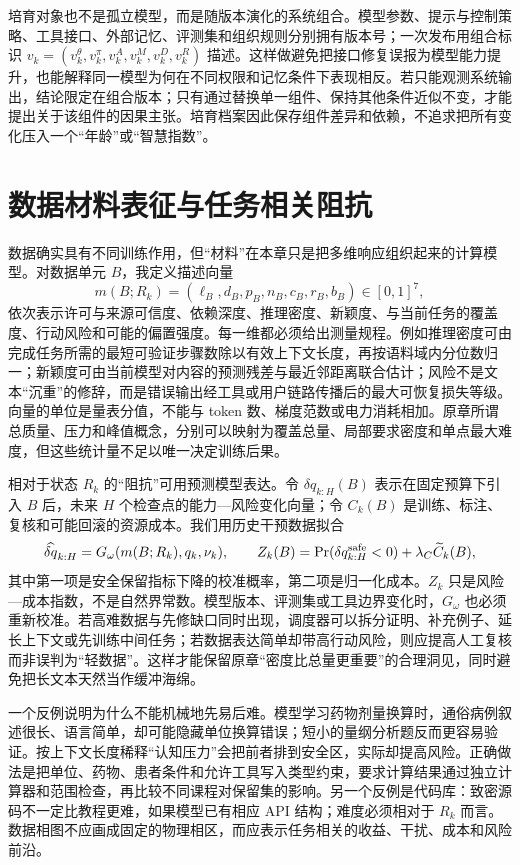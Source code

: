 培育对象也不是孤立模型，而是随版本演化的系统组合。模型参数、提示与控制策略、工具接口、外部记忆、评测集和组织规则分别拥有版本号；一次发布用组合标识 $v_k=(v_k^\theta,v_k^\pi,v_k^A,v_k^M,v_k^D,v_k^R)$ 描述。这样做避免把接口修复误报为模型能力提升，也能解释同一模型为何在不同权限和记忆条件下表现相反。若只能观测系统输出，结论限定在组合版本；只有通过替换单一组件、保持其他条件近似不变，才能提出关于该组件的因果主张。培育档案因此保存组件差异和依赖，不追求把所有变化压入一个“年龄”或“智慧指数”。

\section{数据材料表征与任务相关阻抗}
\label{sec:cognitive_materials_science_nert_density}

数据确实具有不同训练作用，但“材料”在本章只是把多维响应组织起来的计算模型。对数据单元 $B$，我定义描述向量
\begin{equation}
m(B;R_k)=(\ell_B,d_B,p_B,n_B,c_B,r_B,b_B)\in[0,1]^7,
\end{equation}
依次表示许可与来源可信度、依赖深度、推理密度、新颖度、与当前任务的覆盖度、行动风险和可能的偏置强度。每一维都必须给出测量规程。例如推理密度可由完成任务所需的最短可验证步骤数除以有效上下文长度，再按语料域内分位数归一；新颖度可由当前模型对内容的预测残差与最近邻距离联合估计；风险不是文本“沉重”的修辞，而是错误输出经工具或用户链路传播后的最大可恢复损失等级。向量的单位是量表分值，不能与 token 数、梯度范数或电力消耗相加。原章所谓总质量、压力和峰值概念，分别可以映射为覆盖总量、局部要求密度和单点最大难度，但这些统计量不足以唯一决定训练后果。

相对于状态 $R_k$ 的“阻抗”可用预测模型表达。令 $\delta q_{k:H}(B)$ 表示在固定预算下引入 $B$ 后，未来 $H$ 个检查点的能力—风险变化向量；令 $C_k(B)$ 是训练、标注、复核和可能回滚的资源成本。我们用历史干预数据拟合
\begin{equation}
\widehat{\delta q}_{k:H}=G_\omega(m(B;R_k),q_k,\nu_k),\qquad
Z_k(B)=\Pr(\delta q^{\rm safe}_{k:H}<0)+\lambda_C\widetilde C_k(B),
\end{equation}
其中第一项是安全保留指标下降的校准概率，第二项是归一化成本。$Z_k$ 只是风险—成本指数，不是自然界常数。模型版本、评测集或工具边界变化时，$G_\omega$ 也必须重新校准。若高难数据与先修缺口同时出现，调度器可以拆分证明、补充例子、延长上下文或先训练中间任务；若数据表达简单却带高行动风险，则应提高人工复核而非误判为“轻数据”。这样才能保留原章“密度比总量更重要”的合理洞见，同时避免把长文本天然当作缓冲海绵。

一个反例说明为什么不能机械地先易后难。模型学习药物剂量换算时，通俗病例叙述很长、语言简单，却可能隐藏单位换算错误；短小的量纲分析题反而更容易验证。按上下文长度稀释“认知压力”会把前者排到安全区，实际却提高风险。正确做法是把单位、药物、患者条件和允许工具写入类型约束，要求计算结果通过独立计算器和范围检查，再比较不同课程对保留集的影响。另一个反例是代码库：致密源码不一定比教程更难，如果模型已有相应 API 结构；难度必须相对于 $R_k$ 而言。数据相图不应画成固定的物理相区，而应表示任务相关的收益、干扰、成本和风险前沿。

